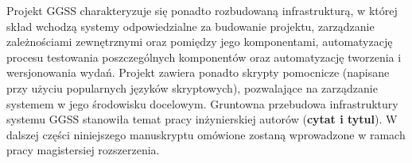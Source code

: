 Projekt GGSS charakteryzuje się ponadto rozbudowaną infrastrukturą, w której skład wchodzą systemy odpowiedzialne za budowanie projektu, zarządzanie zależnościami zewnętrznymi oraz pomiędzy jego komponentami, automatyzację procesu testowania poszczególnych komponentów oraz automatyzację tworzenia i wersjonowania wydań. Projekt zawiera ponadto skrypty pomocnicze (napisane przy użyciu popularnych języków skryptowych), pozwalające na zarządzanie systemem w jego środowisku docelowym. Gruntowna przebudowa infrastruktury systemu GGSS stanowiła temat pracy inżynierskiej autorów (\textbf{cytat i tytul}). W dalszej części niniejszego manuskryptu omówione zostaną wprowadzone w ramach pracy magistersiej rozszerzenia. 




